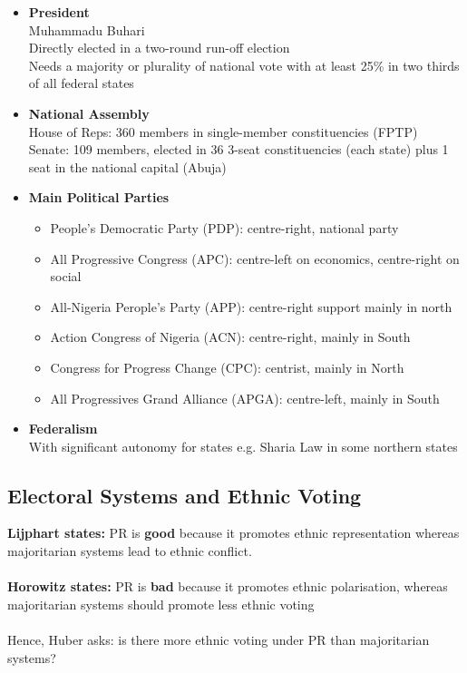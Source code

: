 \documentclass[12pt, letterpaper]{article}
\begin{document}
\begin{itemize}
	\item \textbf{President}\\
		Muhammadu Buhari\\
		Directly elected in a two-round run-off election\\
		Needs a majority or plurality of national vote with at least 25\% in two thirds of all federal states
	\item \textbf{National Assembly}\\
		House of Reps: 360 members in single-member constituencies (FPTP)\\
		Senate: 109 members, elected in 36 3-seat constituencies (each state) plus 1 seat in the national capital (Abuja)
	\item \textbf{Main Political Parties}
		\begin{itemize}
			\item People's Democratic Party (PDP): centre-right, national party
			\item All Progressive Congress (APC): centre-left on economics, centre-right on social
			\item All-Nigeria Perople's Party (APP): centre-right support mainly in north
			\item Action Congress of Nigeria (ACN): centre-right, mainly in South
			\item Congress for Progress Change (CPC): centrist, mainly in North
			\item All Progressives Grand Alliance (APGA): centre-left, mainly in South
		\end{itemize}
	\item \textbf{Federalism}\\
		With significant autonomy for states e.g. Sharia Law in some northern states
\end{itemize}

\subsection{Electoral Systems and Ethnic Voting}
\textbf{Lijphart states:} PR is \textbf{good} because it promotes ethnic representation whereas majoritarian systems lead to ethnic conflict.
\\\\
\noindent\textbf{Horowitz states:} PR is \textbf{bad} because it promotes ethnic polarisation, whereas majoritarian systems should promote less ethnic voting
\\\\
\noindent Hence, Huber asks: is there more ethnic voting under PR than majoritarian systems?
\end{document}
